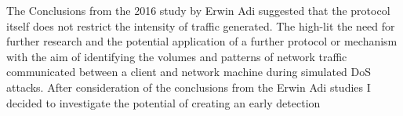 

The Conclusions from the 2016 study by Erwin Adi suggested that the protocol itself does not restrict the intensity of traffic generated. The high-lit the need for further research and the potential application of a further protocol or mechanism with the aim of identifying the volumes and patterns of network traffic communicated between a client and network machine during simulated DoS attacks. After consideration of the conclusions from the Erwin Adi studies I decided to investigate the potential of creating an early detection  
